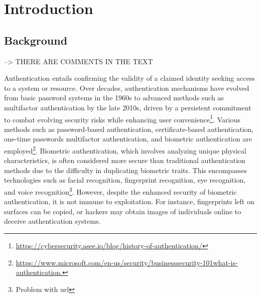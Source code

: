 \section{Introduction}

\subsection{Background}
--> THERE ARE COMMENTS IN THE TEXT

Authentication entails confirming the validity of a claimed identity seeking access to a system or resource. Over decades, authentication mechanisms have evolved from basic password systems in the 1960s to advanced methods such as multifactor authentication by the late 2010s, driven by a persistent commitment to combat evolving security risks while enhancing user convenience\footnote{\url{https://cybersecurity.asee.io/blog/history-of-authentication/}}. Various methods such as password-based authentication, certificate-based authentication, one-time passwords multifactor authentication, and biometric authentication are employed\footnote{\url{https://www.microsoft.com/en-us/security/businesssecurity-101what-is-authentication.}}. Biometric authentication, which involves analyzing unique physical characteristics, is often considered more secure than traditional authentication methods due to the difficulty in duplicating biometric traits. This encompasses technologies such as facial recognition, fingerprint recognition, eye recognition, and voice recognition\footnote{Problem with url}. %
\newline However, despite the enhanced security of biometric authentication, it is not immune to exploitation. For instance, fingerprints left on surfaces can be copied, or hackers may obtain images of individuals online to deceive authentication systems. 


